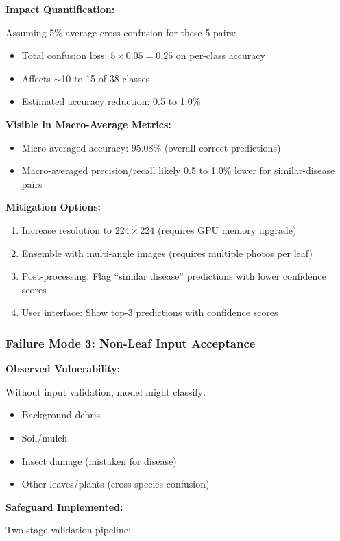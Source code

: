 \documentclass[11pt,a4paper]{article}
\begin{document}
\textbf{Impact Quantification:}

Assuming 5\% average cross-confusion for these 5 pairs:
\begin{itemize}
  \item Total confusion loss: $5 \times 0.05 = 0.25$ on per-class accuracy
  \item Affects $\sim$10 to 15 of 38 classes
  \item Estimated accuracy reduction: 0.5 to 1.0\%
\end{itemize}

\textbf{Visible in Macro-Average Metrics:}
\begin{itemize}
  \item Micro-averaged accuracy: 95.08\% (overall correct predictions)
  \item Macro-averaged precision/recall likely 0.5 to 1.0\% lower for similar-disease pairs
\end{itemize}

\textbf{Mitigation Options:}
\begin{enumerate}
    \item Increase resolution to $224 \times 224$ (requires GPU memory upgrade)
    \item Ensemble with multi-angle images (requires multiple photos per leaf)
    \item Post-processing: Flag ``similar disease'' predictions with lower confidence scores
    \item User interface: Show top-3 predictions with confidence scores
\end{enumerate}

\subsubsection{Failure Mode 3: Non-Leaf Input Acceptance}

\textbf{Observed Vulnerability:}

Without input validation, model might classify:
\begin{itemize}
  \item Background debris
  \item Soil/mulch
  \item Insect damage (mistaken for disease)
  \item Other leaves/plants (cross-species confusion)
\end{itemize}

\textbf{Safeguard Implemented:}

Two-stage validation pipeline:
\end{document}
